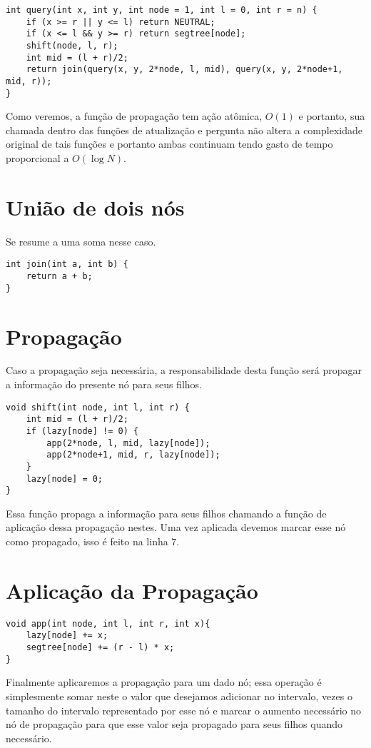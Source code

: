 \begin{lstlisting}
int query(int x, int y, int node = 1, int l = 0, int r = n) {
    if (x >= r || y <= l) return NEUTRAL;
    if (x <= l && y >= r) return segtree[node];
    shift(node, l, r);
    int mid = (l + r)/2;
    return join(query(x, y, 2*node, l, mid), query(x, y, 2*node+1, mid, r));
}
\end{lstlisting}

Como veremos, a função de propagação tem ação atômica, $O(1)$ e portanto, sua chamada dentro das funções de atualização e pergunta não altera a complexidade original de tais funções e portanto ambas continuam tendo gasto de tempo proporcional a $O(\log N)$.

\section{União de dois nós}
Se resume a uma soma nesse caso.
\begin{lstlisting}
int join(int a, int b) {
    return a + b;
}
\end{lstlisting}

\section{Propagação}
Caso a propagação seja necessária, a responsabilidade desta função será propagar a informação do presente nó para seus filhos.

\begin{lstlisting}
void shift(int node, int l, int r) {
    int mid = (l + r)/2;
    if (lazy[node] != 0) {
        app(2*node, l, mid, lazy[node]);
        app(2*node+1, mid, r, lazy[node]);
    }
    lazy[node] = 0;
}
\end{lstlisting}

Essa função propaga a informação para seus filhos chamando a função de aplicação dessa propagação nestes. Uma vez aplicada devemos marcar esse nó como propagado, isso é feito na linha $7$.

\section{Aplicação da Propagação}

\begin{lstlisting}
void app(int node, int l, int r, int x){
	lazy[node] += x;
	segtree[node] += (r - l) * x;
}
\end{lstlisting}

Finalmente aplicaremos a propagação para um dado nó; essa operação é simplesmente somar neste o valor que desejamos adicionar no intervalo, vezes o tamanho do intervalo representado por esse nó e marcar o aumento necessário no nó de propagação para que esse valor seja propagado para seus filhos quando necessário.
